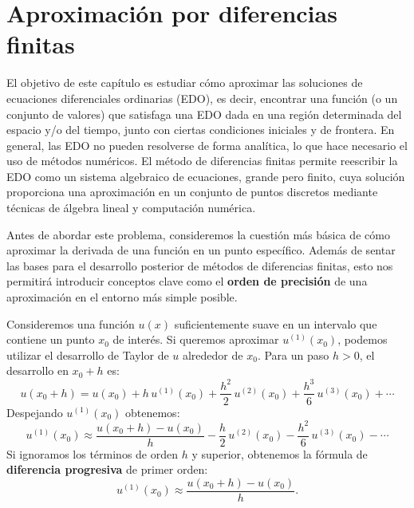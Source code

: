\chapter{Aproximación por diferencias finitas}
\label{chap:diferencias_finitas}

El objetivo de este capítulo es estudiar cómo aproximar las soluciones de ecuaciones diferenciales ordinarias (EDO), es
decir, encontrar una función (o un conjunto de valores) que satisfaga una EDO dada en una región determinada del
espacio y/o del tiempo, junto con ciertas condiciones iniciales y de frontera. En general, las EDO no pueden resolverse
de forma analítica, lo que hace necesario el uso de métodos numéricos. El método de diferencias finitas permite
reescribir la EDO como un sistema algebraico de ecuaciones, grande pero finito, cuya solución proporciona una
aproximación en un conjunto de puntos discretos mediante técnicas de álgebra lineal y computación numérica.

Antes de abordar este problema, consideremos la cuestión más básica de cómo aproximar la derivada de una función en un
punto específico. Además de sentar las bases para el desarrollo posterior de métodos de diferencias finitas, esto nos
permitirá introducir conceptos clave como el \textbf{orden de precisión} de una aproximación en el entorno más simple
posible.

Consideremos una función $u(x)$ suficientemente suave en un intervalo que contiene un punto $x_0$ de interés. Si
queremos aproximar $u^{(1)}(x_0)$, podemos utilizar el desarrollo de Taylor de $u$ alrededor de $x_0$. Para un paso
$h > 0$, el desarrollo en $x_0 + h$ es:
\begin{equation}
    u(x_0 + h) = u(x_0) + h\,u^{(1)}(x_{0}) + \frac{h^2}{2}\,u^{(2)}(x_{0}) + \frac{h^3}{6}\,u^{(3)}(x_{0}) + \cdots
    \label{eq:taylor_forward}
\end{equation}
Despejando $u^{(1)}(x_{0})$ obtenemos:
\begin{equation}
    u^{(1)}(x_{0}) \approx \frac{u(x_0 + h) - u(x_0)}{h} - \frac{h}{2}\,u^{(2)}(x_{0}) - \frac{h^2}{6}\,u^{(3)}(x_{0}) - \cdots
    \label{eq:forward_difference}
\end{equation}
Si ignoramos los términos de orden $h$ y superior, obtenemos la fórmula de \textbf{diferencia progresiva} de primer
orden:
\begin{equation}
    u^{(1)}(x_{0}) \approx \frac{u(x_0 + h) - u(x_0)}{h}.
    \label{eq:forward_difference_truncated}
\end{equation}

